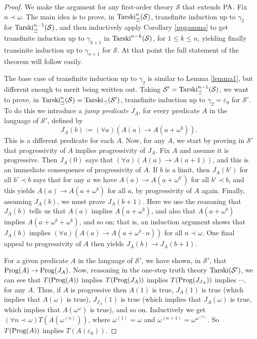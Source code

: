 \documentclass{amsart}
\begin{document}
\begin{proof}
We make the argument for any first-order theory $\mathcal{S}$ that extends ${\rm PA}$.
Fix $n \prec \omega$. The main idea is to prove, in
${\rm Tarski}^n_{\preceq}(\mathcal{S})$, transfinite induction up to $\gamma_2$ for
${\rm Tarski}^{n-1}_{\preceq}(\mathcal{S})$, and then inductively apply Corollary \ref{upgamma} to get
transfinite induction up to $\gamma_{k+1}$ in ${\rm Tarski}^{n-k}(\mathcal{S})$, for $1 \leq k \leq n$,
yielding finally transinite induction up to $\gamma_{n+1}$ for $\mathcal{S}$. At that point the full
statement of the theorem will follow easily.

The base case of transfinite induction up to $\gamma_2$ is similar to Lemma \ref{lemma1}, but
different enough to merit being written out. Taking $\mathcal{S}' = {\rm Tarski}^{n-1}_{\preceq}(\mathcal{S})$,
we want to prove, in ${\rm Tarski}^n_{\preceq}(\mathcal{S}) = {\rm Tarski}_{\preceq}(\mathcal{S}')$, transfinite induction up to $\gamma_2 =\varepsilon_0$ for $\mathcal{S}'$. To do this we introduce a
{\it jump predicate} $J_A$, for every predicate $A$ in the language of $\mathcal{S}'$, defined by
$$J_A(b) := (\forall a)(A(a) \to A(a + \omega^b)).$$
This is a different predicate for each $A$. Now, for any $A$,
we start by proving in $\mathcal{S}'$ that progressivity of $A$ implies progressivity of $J_A$. Fix $A$ and
assume it is progressive. Then $J_A(0)$ says that $(\forall a)(A(a) \to A(a + 1))$, and this
is an immediate consequence of progressivity of $A$. If $b$ is a limit, then $J_A(b')$ for all
$b' \prec b$ says that for any $a$ we have $A(a) \to A(a + \omega^{b'})$ for all $b' \prec b$, and this
yields $A(a) \to A(a + \omega^b)$ for all $a$, by progressivity of $A$ again. Finally, assuming $J_A(b)$,
we must prove $J_A(b+1)$. Here we use the reasoning that $J_A(b)$ tells us that $A(a)$ implies
$A(a + \omega^b)$, and also that $A(a + \omega^b)$ implies $A(a + \omega^b + \omega^b)$, and so on;
that is, an induction argument shows that $J_A(b)$ implies $(\forall a)(A(a) \to A(a + \omega^b\cdot n))$
for all $n \prec \omega$. One final appeal to progressivity of $A$ then yields $J_A(b) \to J_A(b+1)$.

For a given predicate $A$ in the language of $\mathcal{S}'$, we have shown, in $\mathcal{S}'$, that
${\rm Prog}(A) \to {\rm Prog}(J_A)$. Now, reasoning in the one-step truth theory
${\rm Tarski}(\mathcal{S}')$, we can see that $T({\rm Prog}(A))$ implies $T({\rm Prog}(J_A))$ implies
$T({\rm Prog}(J_{J_A}))$ implies $\cdots$, for any $A$. Thus, if $A$ is progressive then $A(1)$ is true,
$J_A(1)$ is true (which implies that $A(\omega)$ is true), $J_{J_A}(1)$ is true (which implies that
$J_A(\omega)$ is true, which implies that $A(\omega^\omega)$ is true), and so on. Inductively we
get $(\forall n \prec \omega)T(A(\omega^{(n)}))$, where $\omega^{(1)} = \omega$ and $\omega^{(n+1)} =
\omega^{\omega^{(n)}}$. So $T({\rm Prog}(A))$ implies $T(A(\varepsilon_0))$.


\end{proof}
\end{document}
